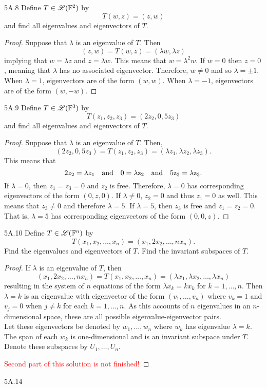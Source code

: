 \documentclass[../../AlgebraQualSolutions.tex]{subfiles}
\begin{document}
\begin{LA}{5A.8}{}
Define $T \in\mathscr{L}(\mathbb{F}^2)$ by
	\[T(w,z) = (z,w)\]
and find all eigenvalues and eigenvectors of $T$.
\end{LA}

\begin{proof}
Suppose that $\lambda$ is an eigenvalue of $T$. Then
	\[(z,w) = T(w,z) = (\lambda w, \lambda z) \]
implying that $w = \lambda z$ and $z = \lambda w$. This means that $w = \lambda^2 w$. If $w= 0$ then $z = 0$, meaning that $\lambda$ has no associated eigenvector. Therefore, $w \neq 0$ and so $\lambda = \pm 1$. When $\lambda = 1$, eigenvectors are of the form $(w,w)$. When $\lambda = -1$, eigenvectors are of the form $(w,-w)$.
\end{proof}

\begin{LA}{5A.9}{}
Define $T \in \mathscr{L}(\mathbb{F}^3)$ by
	\[T(z_1, z_2, z_3) = (2z_2, 0, 5z_3) \]
and find all eigenvalues and eigenvectors of $T$.
\end{LA}

\begin{proof}
Suppose that $\lambda$ is an eigenvalue of $T$. Then,
	\[(2z_2, 0, 5z_3) = T(z_1, z_2, z_3) = (\lambda z_1, \lambda z_2, \lambda z_3). \]
This means that
	\[2z_2 = \lambda z_1 \quad \rm{and} \quad 0 = \lambda z_2 \quad \rm{and} \quad 5z_3 = \lambda z_3. \]
If $\lambda = 0$, then $z_1 = z_3 = 0$ and $z_2$ is free. Therefore, $\lambda = 0$ has corresponding eigenvectors of the form $(0, z, 0)$. If $\lambda \neq 0$, $z_2 = 0$ and thus $z_1 = 0$ as well. This means that $z_3 \neq 0$ and therefore $\lambda = 5$. If $\lambda = 5$, then $z_3$ is free and $z_1 = z_2 = 0$. That is, $\lambda = 5$ has corresponding eigenvectors of the form $(0,0,z)$.
\end{proof}

\begin{LA}{5A.10}{}
Define $T \in \mathscr{L}(\mathbb{F}^n)$ by
	\[T(x_1, x_2, \ldots, x_n) = (x_1, 2x_2, \ldots, n x_n). \]
Find the eigenvalues and eigenvectors of $T$. Find the invariant subspaces of $T$.
\end{LA}

\begin{proof}
If $\lambda$ is an eigenvalue of $T$, then
	\[(x_1, 2x_2, \ldots, n x_n) = T(x_1, x_2, \ldots, x_n) = (\lambda x_1, \lambda x_2, \ldots, \lambda x_n) \]
resulting in the system of $n$ equations of the form $\lambda x_k = k x_k$ for $k = 1, \ldots, n$. Then $\lambda = k$ is an eigenvalue with eigenvector of the form $(v_1, \ldots, v_n)$ where $v_k = 1$ and $v_j = 0$ when $j \neq k$ for each $k = 1, \ldots, n$. As this accounts of $n$ eigenvalues in an $n$-dimensional space, these are all possible eigenvalue-eigenvector pairs.\\

Let these eigenvectors be denoted by $w_1, \ldots, w_n$ where $w_k$ has eigenvalue $\lambda = k$. The span of each $w_k$ is one-dimensional and is an invariant subspace under $T$. Denote these subspaces by $U_1, \ldots, U_n$.

\textcolor{red}{Second part of this solution is not finished!}
\end{proof}

\begin{LA}{5A.14}{}
\end{LA}
\end{document}
